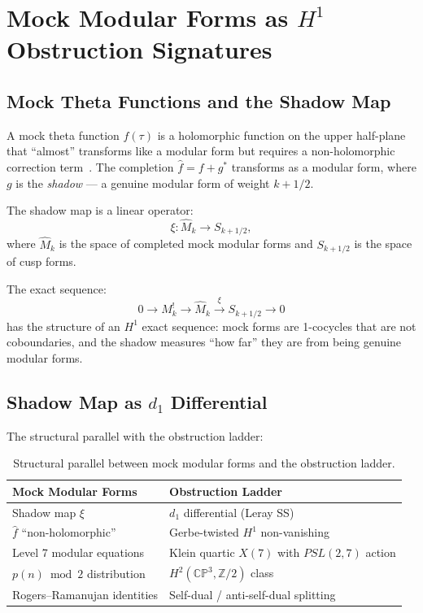 \documentclass[11pt,a4paper]{article}
\theoremstyle{remark}
\newcommand{\CP}{\mathbb{CP}}
\newcommand{\Z}{\mathbb{Z}}
\begin{document}
\section{Mock Modular Forms as $H^1$ Obstruction Signatures}
\label{sec:mock}

\subsection{Mock Theta Functions and the Shadow Map}

A mock theta function $f(\tau)$ is a holomorphic function on the upper
half-plane that ``almost'' transforms like a modular form but requires
a non-holomorphic correction term~\cite{Zwegers}. The completion
$\widehat{f} = f + g^*$ transforms as a modular form, where $g$ is the
\emph{shadow} --- a genuine modular form of weight $k + 1/2$.

The shadow map is a linear operator:
\[
\xi: \widehat{M}_k \longrightarrow S_{k+1/2},
\]
where $\widehat{M}_k$ is the space of completed mock modular forms and
$S_{k+1/2}$ is the space of cusp forms.

The exact sequence:
\[
0 \longrightarrow M^!_k \longrightarrow \widehat{M}_k
\xrightarrow{\;\xi\;} S_{k+1/2} \longrightarrow 0
\]
has the structure of an $H^1$ exact sequence: mock forms are 1-cocycles
that are not coboundaries, and the shadow measures ``how far'' they are
from being genuine modular forms.

\subsection{Shadow Map as $d_1$ Differential}

The structural parallel with the obstruction ladder:

\begin{table}[h]
\centering
\begin{tabular}{l l}
\toprule
Mock Modular Forms & Obstruction Ladder \\
\midrule
Shadow map $\xi$ & $d_1$ differential (Leray SS) \\
$\widehat{f}$ ``non-holomorphic'' & Gerbe-twisted $H^1$ non-vanishing \\
Level 7 modular equations & Klein quartic $X(7)$ with $PSL(2, 7)$ action \\
$p(n) \bmod 2$ distribution & $H^2(\CP^3, \Z/2)$ class \\
Rogers--Ramanujan identities & Self-dual / anti-self-dual splitting \\
\bottomrule
\end{tabular}
\caption{Structural parallel between mock modular forms and the obstruction ladder.}
\label{tab:mock-parallel}
\end{table}
\end{document}
